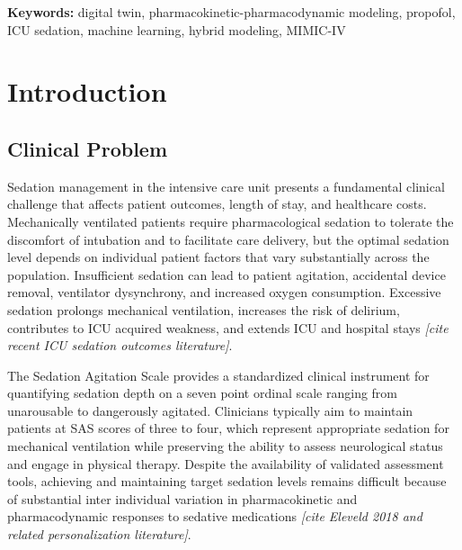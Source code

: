 \documentclass[11pt,a4paper]{article}
\newcommand{\placeholder}[1]{\textcolor{placeholdergray}{\textit{[#1]}}}
\begin{document}
\noindent\textbf{Keywords:} digital twin, pharmacokinetic-pharmacodynamic
modeling, propofol, ICU sedation, machine learning, hybrid modeling,
MIMIC-IV

%

\section{Introduction}

\subsection{Clinical Problem}

Sedation management in the intensive care unit presents a fundamental
clinical challenge that affects patient outcomes, length of stay, and
healthcare costs. Mechanically ventilated patients require pharmacological
sedation to tolerate the discomfort of intubation and to facilitate care
delivery, but the optimal sedation level depends on individual patient
factors that vary substantially across the population. Insufficient
sedation can lead to patient agitation, accidental device removal,
ventilator dysynchrony, and increased oxygen consumption. Excessive
sedation prolongs mechanical ventilation, increases the risk of delirium,
contributes to ICU acquired weakness, and extends ICU and hospital stays
\placeholder{cite recent ICU sedation outcomes literature}.

The Sedation Agitation Scale provides a standardized clinical instrument
for quantifying sedation depth on a seven point ordinal scale ranging
from unarousable to dangerously agitated. Clinicians typically aim to
maintain patients at SAS scores of three to four, which represent
appropriate sedation for mechanical ventilation while preserving the
ability to assess neurological status and engage in physical therapy.
Despite the availability of validated assessment tools, achieving and
maintaining target sedation levels remains difficult because of substantial
inter individual variation in pharmacokinetic and pharmacodynamic
responses to sedative medications \placeholder{cite Eleveld 2018 and
related personalization literature}.
\end{document}
